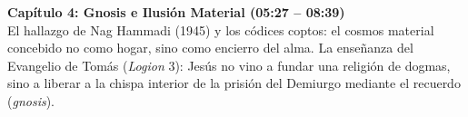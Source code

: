 \documentclass[10pt]{article}
\newenvironment{extraer}[1]{}{}
\begin{document}
\begin{minipage}[t]{0.492\textwidth}
\begin{tcolorbox}[contentStyle, width=\textwidth, equal height group=pagina2]
			\vspace{0.14cm}
			
			{\small\color{deepblue}\bfseries\begin{extraer}{cap4_title}Capítulo 4: Gnosis e Ilusión Material {\footnotesize\color{golddark}(05:27 -- 08:39)}\end{extraer}}\\[0.04cm]
			\justifying
			\begin{extraer}{cap4_desc}
				El hallazgo de Nag Hammadi (1945) y los códices coptos: el cosmos material concebido no como hogar, sino como encierro del alma. La enseñanza del Evangelio de Tomás (\textit{Logion} 3): Jesús no vino a fundar una religión de dogmas, sino a liberar a la chispa interior de la prisión del Demiurgo mediante el recuerdo (\textit{gnosis}).
			\end{extraer}
		\end{tcolorbox}
	\end{minipage}%
	\hfill
\end{document}
